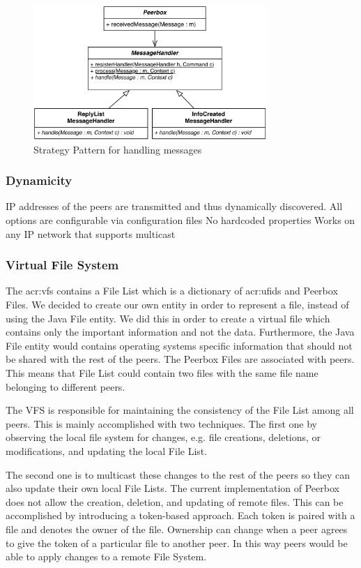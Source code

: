 \begin{figure}[htbp]
\centering
\includegraphics[height=2in]{figures/mhStrategy.pdf}
\caption{Strategy Pattern for handling messages}
\label{fig:figures_mhStrategy}
\end{figure}

\subsubsection{Dynamicity}
IP addresses of the peers are transmitted and thus dynamically discovered.
All options are configurable via configuration files
No hardcoded properties
Works on any IP network that supports multicast


\subsubsection{Virtual File System}
    
The \gls{acr:vfs} contains a File List which is a dictionary of \glspl{acr:ufid} and Peerbox Files. We decided to create our own entity in order to represent a file, instead of using the Java File entity. We did this in order to create a virtual file which contains only the important information and not the data. Furthermore, the Java File entity would contains operating systems specific information that should not be shared with the rest of the peers. The Peerbox Files are associated with peers. This means that File List could contain two files with the same file name belonging to different peers.
    
The VFS is responsible for maintaining the consistency of the File List among all peers. This is mainly accomplished with two techniques. The first one by observing the local file system for changes, e.g. file creations, deletions, or modifications, and updating the local File List.

The second one is to multicast these changes to the rest of the peers so they can also update their own local File Lists. The current implementation of Peerbox does not allow the creation, deletion, and updating of remote files. This can be accomplished by introducing a token-based approach. Each token is paired with a file and denotes the owner of the file. Ownership can change when a peer agrees to give the token of a particular file to another peer. In this way peers would be able to apply changes to a remote File System.

